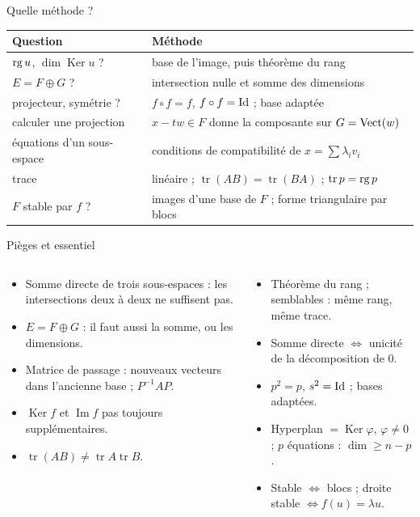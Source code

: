 \documentclass[aspectratio=169,10pt]{beamer}
\newcommand{\Ker}{\operatorname{Ker}}\renewcommand{\Im}{\operatorname{Im}}\newcommand{\tr}{\operatorname{tr}}\newcommand{\Sp}{\operatorname{Sp}}
\begin{document}
\begin{frame}{Quelle méthode ?}
\small
\renewcommand{\arraystretch}{1.28}
\begin{tabular}{@{}p{4.6cm}p{9.2cm}@{}}
\toprule
\textbf{Question} & \textbf{Méthode}\\\midrule
$\operatorname{rg} u$, $\dim\Ker u$ ? & base de l'image, puis théorème du rang\\
$E=F\oplus G$ ? & intersection nulle et somme des dimensions\\
projecteur, symétrie ? & $f\circ f=f$, $f\circ f=\operatorname{Id}$ ; base adaptée\\
calculer une projection & $x-tw\in F$ donne la composante sur $G=\operatorname{Vect}(w)$\\
équations d'un sous-espace & conditions de compatibilité de $x=\sum\lambda_iv_i$\\
trace & linéaire ; $\tr(AB)=\tr(BA)$ ; $\tr p=\rg p$\\
$F$ stable par $f$ ? & images d'une base de $F$ ; forme triangulaire par blocs\\\bottomrule
\end{tabular}
\end{frame}

\begin{frame}{Pièges et essentiel}
\begin{columns}[T]
\begin{PIEGE}
\begin{itemize}
\item Somme directe de trois sous-espaces : les intersections deux à deux ne suffisent pas.
\item $E=F\oplus G$ : il faut aussi la somme, ou les dimensions.
\item Matrice de passage : nouveaux vecteurs dans l'ancienne base ; $P^{-1}AP$.
\item $\Ker f$ et $\Im f$ pas toujours supplémentaires.
\item $\tr(AB)\neq\tr A\tr B$.
\end{itemize}
\end{PIEGE}
\begin{RETENIR}
\begin{itemize}
\item Théorème du rang ; semblables : même rang, même trace.
\item Somme directe $\iff$ unicité de la décomposition de $0$.
\item $p^2=p$, $s^2=\operatorname{Id}$ ; bases adaptées.
\item Hyperplan $=\Ker\varphi$, $\varphi\neq0$ ; $p$ équations : $\dim\geq n-p$.
\item Stable $\iff$ blocs ; droite stable $\iff f(u)=\lambda u$.
\end{itemize}
\end{RETENIR}
\end{columns}
\end{frame}
\end{document}
